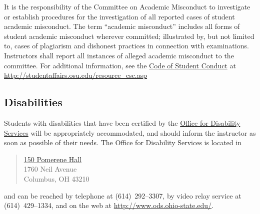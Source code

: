 \documentclass[12pt]{handout}
\begin{document}
It is the responsibility of the Committee on Academic Misconduct to
investigate or establish procedures for the investigation of all
reported cases of student academic misconduct. The term ``academic
misconduct'' includes all forms of student academic misconduct
wherever committed; illustrated by, but not limited to, cases of
plagiarism and dishonest practices in connection with
examinations. Instructors shall report all instances of alleged
academic misconduct to the committee. For additional information, see
the \href{http://studentaffairs.osu.edu/resource_csc.asp}{Code of Student
 Conduct} at \url{http://studentaffairs.osu.edu/resource_csc.asp}

\subsection*{Disabilities}

Students with disabilities that have been certified by the
\href{http://www.ods.ohio-state.edu}{Office for Disability Services}
will be appropriately accommodated, and should inform the instructor
as soon as possible of their needs. The Office for Disability Services
is located in 
\begin{quote}
\href{http://www.osu.edu/map/building.php?building=067}{150 Pomerene Hall}\\
1760 Neil Avenue\\
Columbus, OH\hspace{0.5em} 43210
\end{quote}
and can be reached by telephone at (614)~292--3307, by video relay
service at (614)~429--1334, and on the web at
\url{http://www.ods.ohio-state.edu/}.
\end{document}
